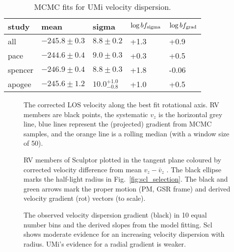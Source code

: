 

\begin{table*}[t]
\centering
\caption[Ursa Minor RV fits]{MCMC fits for UMi velocity dispersion. }
\label{tbl:umi_rv_mcmc}
\begin{tabular}{lllll}
\toprule
study & mean & sigma & $\log bf_{\rm sigma}$ & $\log bf_{\rm grad}$\\
\midrule
all & $-245.8\pm0.3$ & $8.8\pm0.2$ & +1.3 & +0.9\\
pace & $-244.6\pm0.4$ & $9.0\pm0.3$ & +0.3 & +0.5\\
spencer & $-246.9\pm0.4$ & $8.8\pm0.3$ & +1.8 & -0.06\\
apogee & $-245.6\pm1.2$ & $10.0_{-0.8}^{+1.0}$ & +1.0 & +0.5\\
\bottomrule
\end{tabular}
\end{table*}

\begin{figure}
\centering
{}
\caption[Scl velocity gradient]{The corrected LOS velocity along the
best fit rotational axis. RV members are black points, the systematic
\(v_z\) is the horizontal grey line, blue lines represent the
(projected) gradient from MCMC samples, and the orange line is a rolling
median (with a window size of
50).}\label{fig:scl_velocity_gradient_scatter}
\end{figure}

\begin{figure}
\centering
{}
\caption[Sculptor's velocity gradient orientation]{RV members of
Sculptor plotted in the tangent plane coloured by corrected velocity
difference from mean \(v_z - \bar v_z\) . The black ellipse marks the
half-light radius in Fig.~\ref{fig:scl_selection}. The black and green
arrows mark the proper motion (PM, GSR frame) and derived velocity
gradient (rot) vectors (to scale).}
\end{figure}

\begin{figure}
\centering
{}
\caption[Possible gradients in the velocity dispersion]{The observed
velocity dispersion gradient (black) in 10 equal number bins and the
derived slopes from the model fitting. Scl shows moderate evidence for
an increasing velocity dispersion with radius. UMi's evidence for a
radial gradient is weaker.}
\end{figure}


